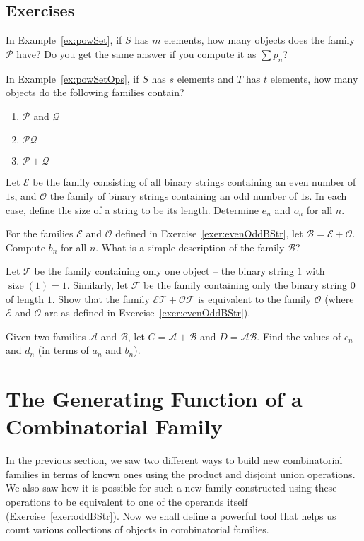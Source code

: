\documentclass[11pt,a5paper]{amsart}
\newcommand{\cat}{\mathcal}
\DeclareMathOperator{\size}{size}
\begin{document}
\subsection*{Exercises}
\begin{exercises}
\item In Example~\ref{ex:powSet}, if $S$ has $m$ elements, how many objects does the family $\cat P$ have? Do you get the same answer if you compute it as $\sum p_n$?
\item In Example~\ref{ex:powSetOps}, if $S$ has $s$ elements and $T$ has $t$ elements, how many objects do the following families contain?
	\begin{enumerate}[label=(\roman*)]
	\item $\cat P$ and $\cat Q$
	\item $\cat P \cat Q$
	\item $\cat P + \cat Q$
	\end{enumerate}
\item\label{exer:evenOddBStr} Let $\cat E$ be the family consisting of all binary strings containing an even number of $1$s, and $\cat O$ the family of binary strings containing an odd number of $1$s. In each case, define the size of a string to be its length. Determine $e_n$ and $o_n$ for all $n$.
\item\label{exer:B=E+O} For the families $\cat E$ and $\cat O$ defined in Exercise~\ref{exer:evenOddBStr}, let $\cat B = \cat E  + \cat O$. Compute $b_n$ for all $n$. What is a simple description of the family $\cat B$?
\item\label{exer:oddBStr} Let $\cat T$ be the family containing only one object -- the binary string $1$ with $\size(1) = 1$. Similarly, let $\cat F$ be the family containing only the binary string $0$ of length $1$. Show that the family $\cat E \cat T + \cat O \cat F$ is equivalent to the family $\cat O$ (where $\cat E$ and $\cat O$ are as defined in Exercise~\ref{exer:evenOddBStr}).
\item\label{exer:seqFamOps} Given two families $\cat A$ and $\cat B$, let $C = \cat A + \cat B$ and $D = \cat A \cat B$. Find the values of $c_n$ and $d_n$ (in terms of $a_n$ and $b_n$).
\end{exercises}

\section{The Generating Function of a Combinatorial Family}\label{sec:genFun}
In the previous section, we saw two different ways to build new combinatorial families in terms of known ones using the product and disjoint union operations. We also saw how it is possible for such a new family constructed using these operations to be equivalent to one of the operands itself (Exercise~\ref{exer:oddBStr}). Now we shall define a powerful tool that helps us count various collections of objects in combinatorial families.
\end{document}
